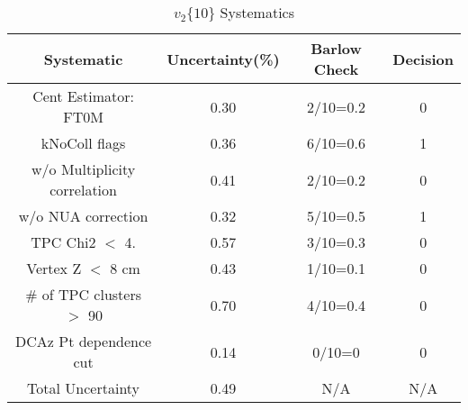 \begin{table}[htbp]
\caption{$v_2\{10\}$ Systematics}
\label{tab:Sys_v210}
\centering
\begin{tabular}{|c|c|c|c|}
\hline
Systematic & Uncertainty(\%) & Barlow Check & Decision \\
\hline
Cent Estimator: FT0M & 0.30 & 2/10=0.2 & 0 \\
kNoColl flags & 0.36 & 6/10=0.6 & 1 \\
w/o Multiplicity correlation & 0.41 & 2/10=0.2 & 0 \\
w/o NUA correction & 0.32 & 5/10=0.5 & 1 \\
TPC Chi2 $<$ 4. & 0.57 & 3/10=0.3 & 0 \\
Vertex Z $<$ 8 cm & 0.43 & 1/10=0.1 & 0 \\
\# of TPC clusters $>$ 90 & 0.70 & 4/10=0.4 & 0 \\
DCAz Pt dependence cut & 0.14 & 0/10=0 & 0 \\
\hline
Total Uncertainty & 0.49 & N/A & N/A \\
\hline
\end{tabular}
\end{table}
